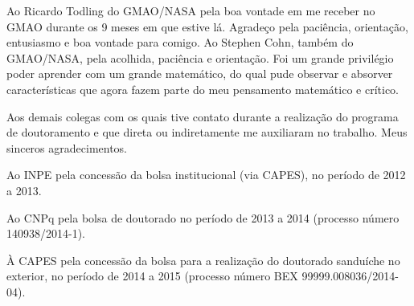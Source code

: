 \begin{agradecimentos}
Ao Ricardo Todling do GMAO/NASA pela boa vontade em me receber no GMAO durante os 9 meses em que estive lá. Agradeço pela paciência, orientação, entusiasmo e boa vontade para comigo. Ao Stephen Cohn, também do GMAO/NASA, pela acolhida, paciência e orientação. Foi um grande privilégio poder aprender com um grande matemático, do qual pude observar e absorver características que agora fazem parte do meu pensamento matemático e crítico.

Aos demais colegas com os quais tive contato durante a realização do programa de doutoramento e que direta ou indiretamente me auxiliaram no trabalho. Meus sinceros agradecimentos.

Ao INPE pela concessão da bolsa institucional (via CAPES), no período de 2012 a 2013.

Ao CNPq pela bolsa de doutorado no período de 2013 a 2014 (processo número 140938/2014-1).

À CAPES pela concessão da bolsa para a realização do doutorado sanduíche no exterior, no período de 2014 a 2015 (processo número BEX 99999.008036/2014-04).

\end{agradecimentos}